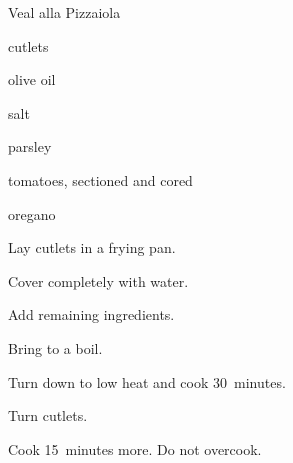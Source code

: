 \begin{recipe}{Veal alla Pizzaiola}{}{}

\begin{ingredients}
\item {} cutlets
\item olive oil
\item salt
\item parsley
\item tomatoes, sectioned and cored
\item oregano
\end{ingredients}

\begin{directions}
\item Lay cutlets in a frying pan.
\item Cover completely with water.
\item Add remaining ingredients.
\item Bring to a boil.
\item Turn down to low heat and cook 30~minutes.
\item Turn cutlets.
\item Cook 15~minutes more. Do not overcook.
\end{directions}

\end{recipe}
